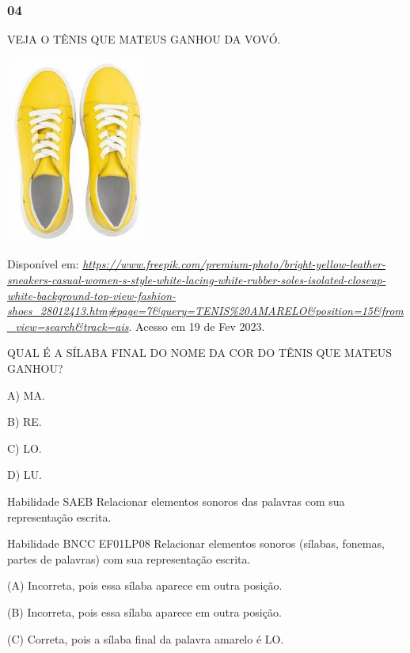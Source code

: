 \subsubsection{04}\label{section-29}

\protect\hypertarget{_heading=h.1hmsyys}{}{}VEJA O TÊNIS QUE MATEUS
GANHOU DA VOVÓ.

\includegraphics[width=1.87986in,height=2.41667in]{media/image189.jpg}

Disponível em:
\href{https://www.freepik.com/premium-photo/bright-yellow-leather-sneakers-casual-women-s-style-white-lacing-white-rubber-soles-isolated-closeup-white-background-top-view-fashion-shoes_28012413.htm\#page=7\&query=TENIS\%20AMARELO\&position=15\&from_view=search\&track=ais}{\emph{https://www.freepik.com/premium-photo/bright-yellow-leather-sneakers-casual-women-s-style-white-lacing-white-rubber-soles-isolated-closeup-white-background-top-view-fashion-shoes\_28012413.htm\#page=7\&query=TENIS\%20AMARELO\&position=15\&from\_view=search\&track=ais}}.
Acesso em 19 de Fev 2023.

QUAL É A SÍLABA FINAL DO NOME DA COR DO TÊNIS QUE MATEUS GANHOU?

A) MA.

B) RE.

C) LO.

D) LU.

\protect\hypertarget{_heading=h.41mghml}{}{}Habilidade SAEB Relacionar
elementos sonoros das palavras com sua representação escrita.

Habilidade BNCC EF01LP08 Relacionar elementos sonoros (sílabas, fonemas,
partes de palavras) com sua representação escrita.

\protect\hypertarget{_heading=h.2grqrue}{}{}(A) Incorreta, pois essa sílaba aparece em outra posição.

(B) Incorreta, pois essa sílaba aparece em outra posição.

(C) Correta, pois a sílaba final da palavra amarelo é LO.

